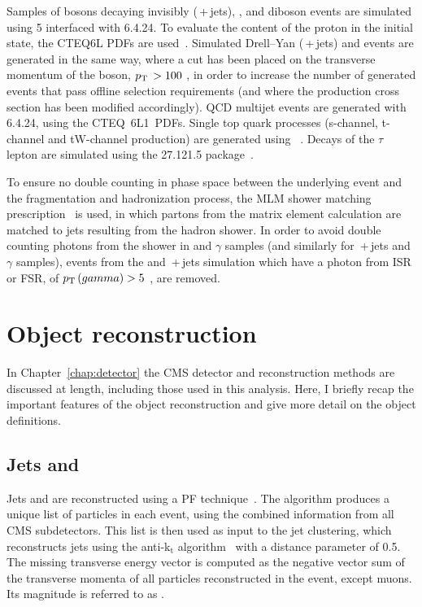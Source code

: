 Samples of \Z bosons decaying invisibly (\znunubr{}\,+\,jets), \ttbar, and diboson events 
are simulated using \MADGRAPH{}5 interfaced with \PYTHIA{}6.4.24. 
To evaluate the content of the proton in the initial state, the CTEQ6L \ac{PDFs} are used~\cite{CTEQ6}. 
Simulated Drell--Yan (\zellellbr{}\,+\,jets) and \wpj{} events are generated in the same way, where a cut has been placed on the transverse momentum of the boson, $p_{\text{T}}\, > 100$ \GeV, in order to increase the number of generated events that pass offline selection requirements (and where the production cross section has been modified accordingly).
QCD multijet events are generated with \PYTHIA{}6.4.24, using the CTEQ~6L1~\ac{PDFs}. 
Single top quark processes (s-channel, t-channel and tW-channel production) are generated using \POWHEG~\cite{powheg_st,powheg_tw}.
Decays of the $\tau$ lepton are simulated using the \TAUOLA{} 27.121.5 package~\cite{TAUOLA}. 

To ensure no double counting in phase space between the underlying event and the fragmentation and hadronization process, the MLM shower matching prescription~\cite{bib:GEN_MLM} is used, in which partons from the matrix element calculation are matched to jets resulting from the hadron shower.
In order to avoid double counting photons from the \PYTHIA shower in \wpj{} and \W$\gamma$ samples (and similarly for \zellellbr{}\,+\,jets and \Z$\gamma$ samples), 
events from the \wpj{} and \zellellbr{}\,+\,jets simulation which have a photon from \ac{ISR} or \ac{FSR}, of $p_{\text{T}}\,(gamma)>5$ \GeV, are removed.


\section{Object reconstruction}
\label{sec:objectReco}

In Chapter~\ref{chap:detector} the CMS detector and reconstruction methods are discussed at length, including those used in this analysis. 
Here, I briefly recap the important features of the object reconstruction and give more detail on the object definitions.

\subsection{Jets and \MET}

Jets and \MET are reconstructed using a \ac{PF}
technique~\cite{PFT-09-001}. The algorithm produces a unique list 
of particles in each event, using the combined information from all 
CMS subdetectors. This list is then used as input to the jet 
clustering, which reconstructs jets using the anti-k$_{\mathrm{t}}$
algorithm~\cite{bib:akjets} with a distance parameter of 0.5.  
The missing transverse energy vector \METvmu is computed as the negative vector 
sum of the transverse momenta of all particles reconstructed in the 
event, except muons.
Its magnitude is referred to as \METmu.


